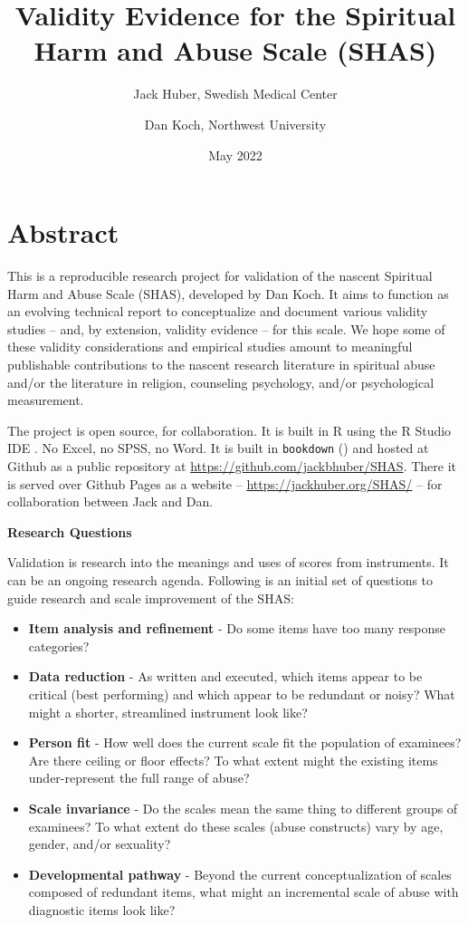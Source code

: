 \documentclass[
]{article}
\title{Validity Evidence for the Spiritual Harm and Abuse Scale (SHAS)}
\author{Jack Huber, Swedish Medical Center \and Dan Koch, Northwest University}
\date{May 2022}
\providecommand{\tightlist}{%
  \setlength{\itemsep}{0pt}\setlength{\parskip}{0pt}}
\begin{document}
\maketitle

{
\setcounter{tocdepth}{2}
\tableofcontents
}
\hypertarget{abstract}{%
\section{Abstract}\label{abstract}}

This is a reproducible research project for validation of the nascent Spiritual Harm and Abuse Scale (SHAS), developed by Dan Koch. It aims to function as an evolving technical report to conceptualize and document various validity studies -- and, by extension, validity evidence -- for this scale. We hope some of these validity considerations and empirical studies amount to meaningful publishable contributions to the nascent research literature in spiritual abuse and/or the literature in religion, counseling psychology, and/or psychological measurement.

The project is open source, for collaboration. It is built in R using the R Studio IDE \citep{R-base}. No Excel, no SPSS, no Word. It is built in \texttt{bookdown} (\citet{R-bookdown}) and hosted at Github as a public repository at \url{https://github.com/jackbhuber/SHAS}. There it is served over Github Pages as a website -- \url{https://jackhuber.org/SHAS/} -- for collaboration between Jack and Dan.

\textbf{Research Questions}

Validation is research into the meanings and uses of scores from instruments. It can be an ongoing research agenda. Following is an initial set of questions to guide research and scale improvement of the SHAS:

\begin{itemize}
\tightlist
\item
  \textbf{Item analysis and refinement} - Do some items have too many response categories?
\item
  \textbf{Data reduction} - As written and executed, which items appear to be critical (best performing) and which appear to be redundant or noisy? What might a shorter, streamlined instrument look like?
\item
  \textbf{Person fit} - How well does the current scale fit the population of examinees? Are there ceiling or floor effects? To what extent might the existing items under-represent the full range of abuse?
\item
  \textbf{Scale invariance} - Do the scales mean the same thing to different groups of examinees? To what extent do these scales (abuse constructs) vary by age, gender, and/or sexuality?
\item
  \textbf{Developmental pathway} - Beyond the current conceptualization of scales composed of redundant items, what might an incremental scale of abuse with diagnostic items look like?
\end{itemize}
\end{document}
